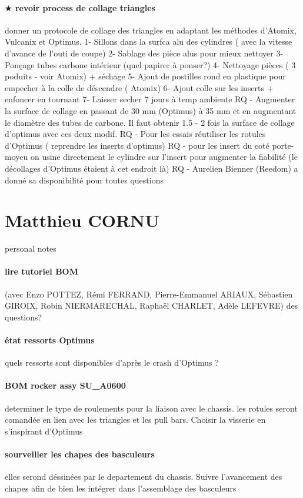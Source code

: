 \paragraph{$\bigstar$ revoir process de collage triangles} donner un protocole de collage des triangles en adaptant les méthodes d'Atomix, Vulcanix et Optimus. 
1- Sillons dans la surfca alu des cylindres ( avec la vitesse d'avance de l'outi de coupe) 
2- Sablage des pièce alus pour mieux nettoyer
3- Ponçage tubes carbone intérieur (quel papirer à ponser?)
4- Nettoyage pièces ( 3 poduits - voir Atomix) + séchage
5- Ajout de postilles rond en plastique pour empecher à la colle de déscendre ( Atomix)
6- Ajout colle sur les inserts + enfoncer en tournant
7- Laisser secher 7 jours à temp ambiente
RQ - Augmenter la surface de collage en passant de 30 mm (Optimus) à 35 mm et en augmentant le diamètre des tubes de carbone. Il faut obtenir 1.5 - 2 fois la surface de collage d'optimus avec ces deux modif.
RQ - Pour les essais réutiliser les rotules d'Optimus ( reprendre les inserts d'optimus)
RQ - pour les insert du coté porte-moyeu on usine directement le cylindre sur l'insert pour augmenter la fiabilité (le décollages d'Optimus étaient à cet endroit là)
RQ - Aurelien Bienner (Reedom) a donné sa disponibilité pour toutes questions

 
 \newpage \section*{Matthieu CORNU} 
 \par personal notes
\paragraph{lire tutoriel BOM} (avec Enzo POTTEZ, Rémi FERRAND, Pierre-Emmanuel ARIAUX, Sébastien GIROIX, Robin NIERMARECHAL, Raphaël CHARLET, Adèle LEFEVRE) des questions?
\paragraph{état ressorts Optimus} quels ressorts sont disponibles d'après le crash d'Optimus ?
\paragraph{BOM rocker assy SU\_A0600} determiner le type de roulements pour la liaison avec le chassis. les rotules seront comandée en lien avec les triangles et les pull bars. Choisir la visserie en s'inspirant d'Optimus
\paragraph{sourveiller les chapes des basculeurs} elles serond déssinées par le departement du chassis. Suivre l'avancement des chapes afin de bien les intégrer dans l'assemblage des basculeurs

